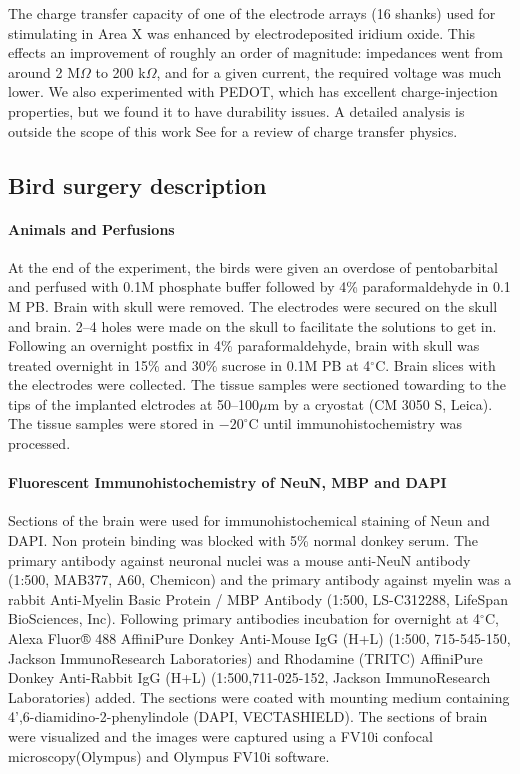 \documentclass[10pt,letterpaper]{article}
\let\oldmarginpar\marginpar
\renewcommand{\marginpar}[1]{\oldmarginpar{\linespread{1}\scriptsize{#1}}}
\renewcommand{\subsubsection}[1]{\paragraph{#1}}
\begin{document}
The charge transfer capacity of one of the electrode arrays (16
shanks) used for stimulating in Area X was enhanced by
electrodeposited iridium oxide. This effects an improvement of roughly
an order of magnitude: impedances went from around 2 M$\Omega$ to 200
k$\Omega$, and for a given current, the required voltage was much
lower.\marginpar{FIXME} We also experimented with PEDOT, which has
excellent charge-injection properties, but we found it to have
durability issues. A detailed analysis is outside the scope of this
work\marginpar{All I know about this is hearsay.}  See
\cite{Cogan2008electrodes} for a review of charge transfer physics.

\subsection{Bird surgery description}

\subsubsection{Animals and Perfusions}

At the end of the experiment, the birds were given an overdose of
pentobarbital and perfused with 0.1M phosphate buffer followed by 4\%
paraformaldehyde in 0.1 M PB.  Brain with skull were removed. The
electrodes were secured on the skull and brain. 2--4 holes were made
on the skull to facilitate the solutions to get in. Following an
overnight postfix in 4\% paraformaldehyde, brain with skull was
treated overnight in 15\% and 30\% sucrose\marginpar{Which?} in 0.1M PB at 4$^\circ$C.
Brain slices with the electrodes were collected. The tissue samples
were sectioned towarding to the tips of the implanted elctrodes at
50--100$\mu$m by a cryostat (CM 3050 S, Leica). The tissue samples
were stored in $-20^\circ$C until immunohistochemistry was processed.

\subsubsection{Fluorescent Immunohistochemistry of NeuN, MBP and DAPI}

Sections of the brain were used for immunohistochemical staining of
Neun and DAPI. Non protein binding was blocked with 5\% normal donkey
serum. The primary antibody against neuronal nuclei was a mouse
anti-NeuN antibody (1:500, MAB377, A60, Chemicon) and the primary
antibody against myelin was a rabbit Anti-Myelin Basic Protein / MBP
Antibody (1:500, LS-C312288, LifeSpan BioSciences, Inc). Following
primary antibodies incubation for overnight at 4$^\circ$C, Alexa
Fluor® 488 AffiniPure Donkey Anti-Mouse IgG (H+L) (1:500, 715-545-150,
Jackson ImmunoResearch Laboratories) and Rhodamine (TRITC) AffiniPure
Donkey Anti-Rabbit IgG (H+L) (1:500,711-025-152, Jackson
ImmunoResearch Laboratories) added. The sections were coated with
mounting medium containing 4',6-diamidino-2-phenylindole (DAPI,
VECTASHIELD).  The sections of brain were visualized and the images
were captured using a FV10i confocal microscopy(Olympus) and Olympus
FV10i software.
\end{document}
